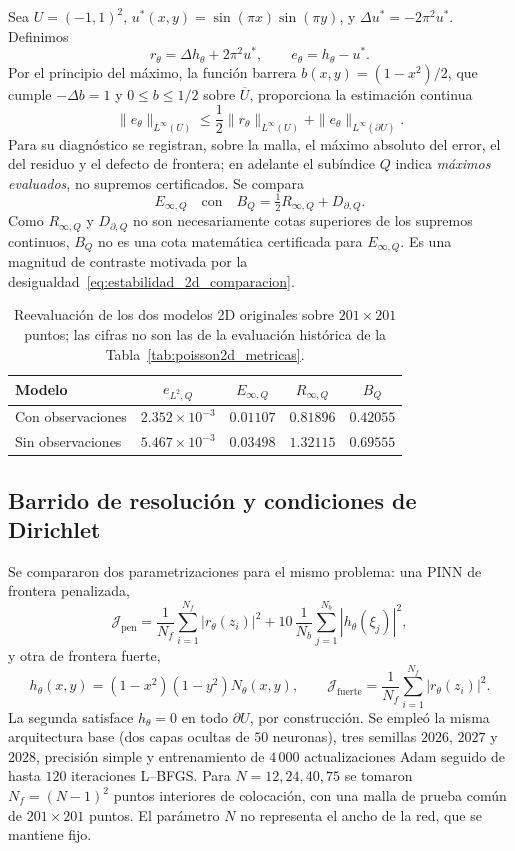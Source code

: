 Sea $U=(-1,1)^2$, $u^*(x,y)=\sin(\pi x)\sin(\pi y)$, y $\Delta u^*=-2\pi^2u^*$. Definimos
\[
  r_\theta=\Delta h_\theta+2\pi^2u^*, \qquad e_\theta=h_\theta-u^*.
\]
Por el principio del máximo, la función barrera $b(x,y)=(1-x^2)/2$, que cumple $-\Delta b=1$ y $0\leq b\leq1/2$ sobre $\overline U$, proporciona la estimación continua
\begin{equation}
\label{eq:estabilidad_2d_comparacion}
 \|e_\theta\|_{L^\infty(U)}\leq
 \frac12\|r_\theta\|_{L^\infty(U)}+
 \|e_\theta\|_{L^\infty(\partial U)}.
\end{equation}
Para su diagnóstico se registran, sobre la malla, el máximo absoluto del error, el del residuo y el defecto de frontera; en adelante el subíndice $Q$ indica \emph{máximos evaluados}, no supremos certificados. Se compara
\[
  E_{\infty,Q}\quad\text{con}\quad B_Q=\tfrac12 R_{\infty,Q}+D_{\partial,Q}.
\]
Como $R_{\infty,Q}$ y $D_{\partial,Q}$ no son necesariamente cotas superiores de los supremos continuos, $B_Q$ no es una cota matemática certificada para $E_{\infty,Q}$. Es una magnitud de contraste motivada por la desigualdad~\eqref{eq:estabilidad_2d_comparacion}.

\begin{table}[htbp]
\centering
\caption{Reevaluación de los dos modelos 2D originales sobre $201\times201$ puntos; las cifras no son las de la evaluación histórica de la Tabla~\ref{tab:poisson2d_metricas}.}
\label{tab:poisson2d_estabilidad_originales}
\small
\begin{tabular}{lcccc}
\hline
Modelo & $e_{L^2,Q}$ & $E_{\infty,Q}$ & $R_{\infty,Q}$ & $B_Q$ \\
\hline
Con observaciones & $2.352\times10^{-3}$ & $0.01107$ & $0.81896$ & $0.42055$ \\
Sin observaciones & $5.467\times10^{-3}$ & $0.03498$ & $1.32115$ & $0.69555$ \\
\hline
\end{tabular}
\end{table}

\subsection{Barrido de resolución y condiciones de Dirichlet}
\label{subsec:poisson2d_barrido}

Se compararon dos parametrizaciones para el mismo problema: una PINN de frontera penalizada,
\[
 \mathcal J_{\mathrm{pen}}=\frac{1}{N_f}\sum_{i=1}^{N_f}|r_\theta(z_i)|^2
 +10\,\frac{1}{N_b}\sum_{j=1}^{N_b}|h_\theta(\xi_j)|^2,
\]
y otra de frontera fuerte,
\[
 h_\theta(x,y)=(1-x^2)(1-y^2)N_\theta(x,y),
 \qquad \mathcal J_{\mathrm{fuerte}}=\frac{1}{N_f}\sum_{i=1}^{N_f}|r_\theta(z_i)|^2.
\]
La segunda satisface $h_\theta=0$ en todo $\partial U$, por construcción. Se empleó la misma arquitectura base (dos capas ocultas de $50$ neuronas), tres semillas $2026$, $2027$ y $2028$, precisión simple y entrenamiento de $4\,000$ actualizaciones Adam seguido de hasta $120$ iteraciones L--BFGS. Para $N=12,24,40,75$ se tomaron $N_f=(N-1)^2$ puntos interiores de colocación, con una malla de prueba común de $201\times201$ puntos. El parámetro $N$ no representa el ancho de la red, que se mantiene fijo.


